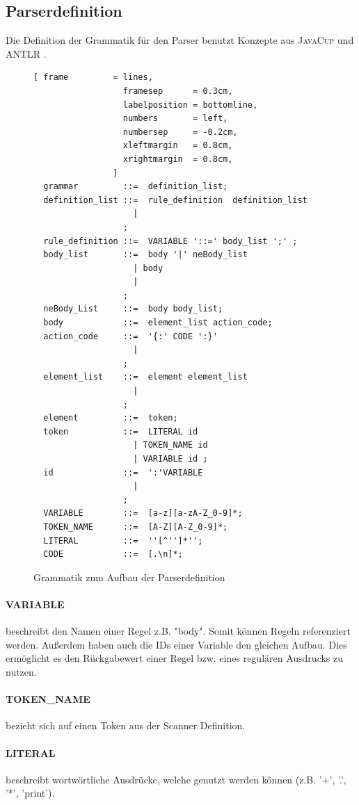 \subsection{Parserdefinition}
Die Definition der Grammatik für den Parser benutzt Konzepte aus \textsc{JavaCup} und \textsc{ANTLR} .
\begin{figure}[!ht]
\begin{Verbatim}[ frame         = lines, 
                  framesep      = 0.3cm, 
                  labelposition = bottomline,
                  numbers       = left,
                  numbersep     = -0.2cm,
                  xleftmargin   = 0.8cm,
                  xrightmargin  = 0.8cm,
                ]
  grammar         ::=  definition_list;
  definition_list ::=  rule_definition  definition_list
	                | 
                  ;
  rule_definition ::=  VARIABLE '::=' body_list ';' ;
  body_list       ::=  body '|' neBody_list
	                | body
	                | 
                  ;
  neBody_List     ::=  body body_list;
  body            ::=  element_list action_code;
  action_code     ::=  '{:' CODE ':}'
	                | 
                  ;
  element_list    ::=  element element_list
	                | 
                  ;
  element         ::=  token;
  token           ::=  LITERAL id
	                | TOKEN_NAME id
	                | VARIABLE id ;
  id              ::=  ':'VARIABLE
	                |
                  ;
  VARIABLE        ::=  [a-z][a-zA-Z_0-9]*;
  TOKEN_NAME      ::=  [A-Z][A-Z_0-9]*;
  LITERAL         ::=  ''[^'']*'';
  CODE            ::=  [.\n]*;
\end{Verbatim}
\caption{Grammatik zum Aufbau der Parserdefinition}
\label{fig:parser_grammar}
\end{figure}
\paragraph{VARIABLE} beschreibt den Namen einer Regel z.B. "body". Somit können Regeln referenziert werden.  Außerdem haben auch die IDs einer Variable den gleichen Aufbau. Dies ermöglicht es den Rückgabewert einer Regel bzw. eines regulären Ausdrucks zu nutzen.
\paragraph{TOKEN\_NAME} bezieht sich auf einen Token aus der Scanner Definition.
\paragraph{LITERAL}  beschreibt wortwörtliche Ausdrücke, welche genutzt werden können (z.B. '+', '.', '*', 'print').
